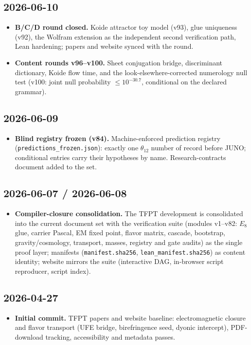 \documentclass[11pt]{article}
\begin{document}
\subsection*{2026-06-10}
\begin{itemize}
\item \textbf{B/C/D round closed.} Koide attractor toy model (v93), glue uniqueness (v92),
  the Wolfram extension as the independent second verification path, Lean hardening; papers
  and website synced with the round.
\item \textbf{Content rounds v96--v100.} Sheet conjugation bridge, discriminant dictionary,
  Koide flow time, and the look-elsewhere-corrected numerology null test (v100: joint null
  probability $\le10^{-30.7}$, conditional on the declared grammar).
\end{itemize}

\subsection*{2026-06-09}
\begin{itemize}
\item \textbf{Blind registry frozen (v84).} Machine-enforced prediction registry
  (\texttt{predictions\_frozen.json}): exactly one $\theta_{12}$ number of record before
  JUNO; conditional entries carry their hypotheses by name. Research-contracts document
  added to the set.
\end{itemize}

\subsection*{2026-06-07 / 2026-06-08}
\begin{itemize}
\item \textbf{Compiler-closure consolidation.} The TFPT development is consolidated into the
  current document set with the verification suite (modules v1--v82: $E_8$ glue, carrier
  Pascal, EM fixed point, flavor matrix, cascade, bootstrap, gravity/cosmology, transport,
  masses, registry and gate audits) as the single proof layer; manifests
  (\texttt{manifest.sha256}, \texttt{lean\_manifest.sha256}) as content identity; website
  mirrors the suite (interactive DAG, in-browser script reproducer, script index).
\end{itemize}

\subsection*{2026-04-27}
\begin{itemize}
\item \textbf{Initial commit.} TFPT papers and website baseline: electromagnetic closure and
  flavor transport (UFE bridge, birefringence seed, dyonic intercept), PDF-download
  tracking, accessibility and metadata passes.
\end{itemize}

\ifdefined\ChangelogImported\else
\end{document}

